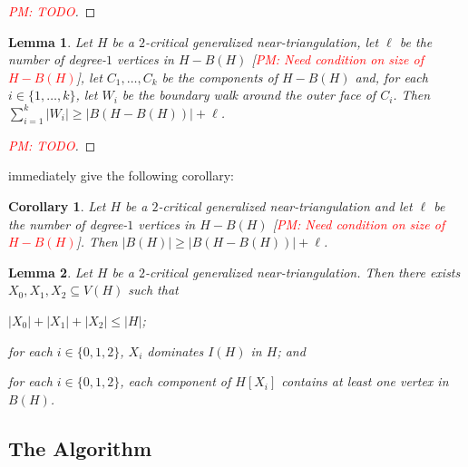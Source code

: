 \documentclass[12pt]{article}
\newtheorem{lem}{Lemma}
\newtheorem{cor}{Corollary}
\theoremstyle{definition}
\newcommand{\pat}[1]{[\textcolor{red}{PM: #1}]}
\begin{document}
\begin{proof}
  \pat{TODO}
\end{proof}



\begin{lem}\label{walk_vs_leaves}
  Let $H$ be a $2$-critical generalized near-triangulation, let $\ell$ be the number of degree-$1$ vertices in $H-B(H)$ \pat{Need condition on size of $H-B(H)$}, let $C_1,\ldots,C_k$ be the components of $H-B(H)$ and, for each $i\in\{1,\ldots,k\}$, let $W_i$ be the boundary walk around the outer face of $C_i$. Then $\sum_{i=1}^k |W_i|\ge |B(H-B(H))|+\ell$.
\end{lem}

\begin{proof}
 \pat{TODO}
\end{proof}

 immediately give the following corollary:

\begin{cor}\label{boundary_vs_leaves}
  Let $H$ be a $2$-critical generalized near-triangulation and let $\ell$ be the number of degree-$1$ vertices in $H-B(H)$ \pat{Need condition on size of $H-B(H)$}. Then $|B(H)|\ge |B(H-B(H))|+\ell$.
\end{cor}


\begin{lem}
  Let $H$ be a $2$-critical generalized near-triangulation.  Then there exists $X_0,X_1,X_2\subseteq V(H)$ such that
  \begin{compactenum}
      \item $|X_0|+|X_1|+|X_2| \le |H|$;
      \item for each $i\in\{0,1,2\}$, $X_i$ dominates $I(H)$ in $H$; and
      \item for each $i\in\{0,1,2\}$, each component of $H[X_i]$ contains at least one vertex in $B(H)$.
  \end{compactenum}
\end{lem}



\subsection{The Algorithm}
\end{document}
